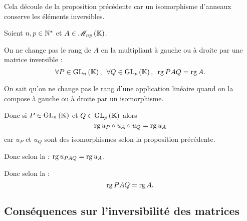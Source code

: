 \begin{dem}
Cela découle de la proposition précédente car un isomorphisme d'anneaux conserve les éléments inversibles.
\end{dem}

\begin{prop}
Soient \(n,p\in\mathbb{N}^*\) et \(A\in\M{np}\).

On ne change pas le rang de \(A\) en la multipliant à gauche ou à droite par une matrice inversible : \[\quantifs{\forall P\in\GL{n};\forall Q\in\GL{p}}\rg PAQ=\rg A.\]
\end{prop}

\begin{dem}
On sait qu'on ne change pas le rang d'une application linéaire quand on la compose à gauche ou à droite par un isomorphisme.

Donc si \(P\in\GL{n}\) et \(Q\in\GL{p}\) alors \[\operatorname{rg} u_P\circ u_A\circ u_Q=\operatorname{rg} u_A\] car \(u_P\) et \(u_Q\) sont des isomorphismes selon la proposition précédente.

Donc selon la  : \(\operatorname{rg} u_{PAQ}=\operatorname{rg} u_A\).

Donc selon la  : \[\operatorname{rg} PAQ=\operatorname{rg} A.\]
\end{dem}

\subsection{Conséquences sur l'inversibilité des matrices}

